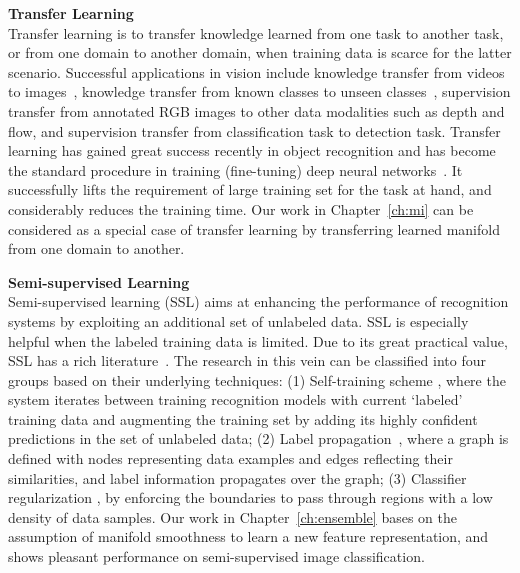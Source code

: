 \textbf{Transfer Learning}  \\
Transfer learning is to transfer knowledge learned from one task to another task, or from one domain to another domain, when training data is scarce for the latter scenario. 
 Successful applications in vision include knowledge transfer from videos to images~\citep{tl:kernel:11, DA:iccv11,
  DASA:iccv13}, knowledge transfer from known classes to unseen
classes~\citep{tl:attribute:09},  supervision transfer \citep{SuTransfer}  from annotated RGB images to other data modalities such
 as depth and flow, and supervision transfer \citep{lsda}  from classification task to detection task. 
Transfer learning has gained great success recently in object recognition and has become the standard procedure in training (fine-tuning) deep neural networks~\citep{rcnn, Long_2015_CVPR}. It successfully lifts the requirement of large training set for the task at hand, and considerably reduces the training time.  
Our work in Chapter~\ref{ch:mi} can be considered as a special case of transfer learning by transferring learned manifold from one domain to another. 
  
\textbf{Semi-supervised Learning}  \\
Semi-supervised learning (SSL) aims at enhancing the
performance of recognition systems  by exploiting an additional set of
unlabeled data. SSL is especially helpful when the labeled training data is limited. 
Due to its great practical value, SSL has a rich
literature~\citep{book06:ssl, Zhu:ISL:2009}.  The research in this vein can be classified into 
four groups based on their underlying techniques:  
(1) Self-training scheme \citep{co-training:98, Guillaumin:cvpr:10, Semi:eccv12}, where the system iterates between training
recognition models with current `labeled' training data and augmenting
the training set by adding its highly confident predictions in the set
of unlabeled data; (2)  Label propagation~\citep{Zhu:Harmonic:03, Zhou:nips:04, Belkin:semiframe:2006, Fergus09, Ebert2013}, where a graph is defined with nodes representing data examples and edges reflecting their
similarities, and label information propagates over the graph; (3) Classifier regularization \citep{Joachims:1999, SemiSVM, SemiForest, deep:ssl}, by enforcing the boundaries to pass through regions with a low density of data samples.
Our work in Chapter~\ref{ch:ensemble} bases on the assumption of manifold smoothness to learn a new feature representation, and shows pleasant performance on semi-supervised image classification.  
 
